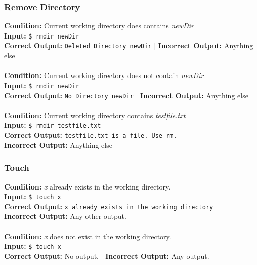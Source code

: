\documentclass[12pt, letterpaper]{article}
\begin{document}
\subsubsection{Remove Directory}
\textbf{Condition:}  Current working directory does contains \emph{newDir} \\
\textbf{Input:} \texttt{\$ rmdir newDir}\\
\textbf{Correct Output:} \texttt{Deleted Directory newDir} | \textbf{Incorrect Output:} Anything else\\
\\
\textbf{Condition:}  Current working directory does not contain \emph{newDir} \\
\textbf{Input:} \texttt{\$ rmdir newDir}\\
\textbf{Correct Output:} \texttt{No Directory newDir} | \textbf{Incorrect Output:} Anything else\\
\\
\textbf{Condition:}  Current working directory contains \emph{testfile.txt} \\
\textbf{Input:} \texttt{\$ rmdir testfile.txt}\\
\textbf{Correct Output:} \texttt{testfile.txt is a file. Use rm.}\\ \textbf{Incorrect Output:} Anything else\\


\subsubsection{Touch}
\textbf{Condition:} \emph{x} already exists in the working directory.\\
\textbf{Input:} \texttt{\$ touch x}\\
\textbf{Correct Output:} \texttt{x already exists in the working directory}\\
\textbf{Incorrect Output:} Any other output.\\
\\
\textbf{Condition:} \emph{x} does not exist in the working directory.\\
\textbf{Input:} \texttt{\$ touch x}\\
\textbf{Correct Output:} No output. |
\textbf{Incorrect Output:} Any output.
\end{document}
